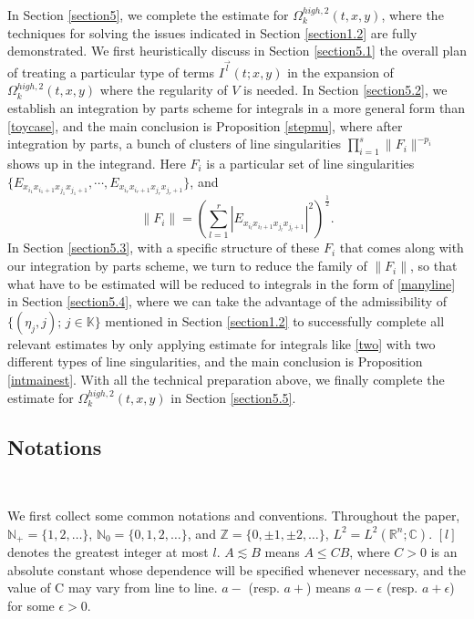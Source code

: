 \documentclass[11pt,reqno]{amsart}
\def\R {\mathbb{R}}
\numberwithin{equation}{section}
\theoremstyle{definition}
\begin{document}
In Section \ref{section5}, we complete the estimate for $\Omega_k^{high,2}(t,x,y)$, where the techniques for solving the issues indicated in Section \ref{section1.2} are fully demonstrated. We first heuristically discuss in Section \ref{section5.1} the overall plan of treating a particular type of terms $I^{\vec{l}}(t;x,y)$ in the expansion of $\Omega_k^{high,2}(t,x,y)$ where the regularity of $V$ is needed. In Section \ref{section5.2}, we establish an integration by parts scheme for integrals in a more general form than \eqref{toycase}, and the main conclusion is Proposition \ref{stepmu}, where after integration by parts, a bunch of clusters of line singularities $\prod_{i=1}^{s}\|F_i\|^{-{p_i}}$ shows up in the integrand. Here $F_i$ is a particular set of line singularities $\{E_{x_{i_1}x_{i_1+1}x_{j_1}x_{j_1+1}},\cdots,E_{x_{i_r}x_{i_r+1}x_{j_r}x_{j_r+1}}\}$, and
\begin{equation*}
	\|F_i\|=\left(\sum_{l=1}^r|E_{x_{i_l}x_{i_l+1}x_{j_l}x_{j_l+1}}|^2\right)^\frac12.
\end{equation*}
In Section \ref{section5.3}, with a specific structure of these $F_i$ that comes along with our integration by parts scheme, we turn to reduce the family of $\|F_i\|$, so that what have to be estimated will be reduced to integrals in the form of \eqref{manyline} in Section \ref{section5.4}, where we can take the advantage of the admissibility of $\{(\eta_j,j);\,j\in\mathbb{K}\}$ mentioned in Section \ref{section1.2} to successfully complete all relevant estimates by only applying estimate for integrals like \eqref{two} with two different types of line singularities, and the main conclusion is Proposition \ref{intmainest}. With all the technical preparation above, we finally complete the estimate for $\Omega_k^{high,2}(t,x,y)$ in Section \ref{section5.5}.

\subsection{Notations}\

We first collect some common notations and conventions.
Throughout the paper, $\mathbb{N}_+=\{1,2,\ldots\}$, $\mathbb{N}_0=\{0,1,2,\ldots\}$, and $\mathbb{Z}=\{0,\pm1, \pm2,\ldots\}$, $L^2=L^2(\R^n;\mathbb{C})$. $[l]$ denotes the greatest integer at most $l$. $A\lesssim B$ means $A \leq  CB$, where $C>0$ is an absolute constant whose dependence will be specified whenever necessary, and the value of C may vary from line to line. $a-$ (resp. $a+$) means $a-\epsilon$ (resp. $a+\epsilon$) for some $\epsilon>0$.
\end{document}
